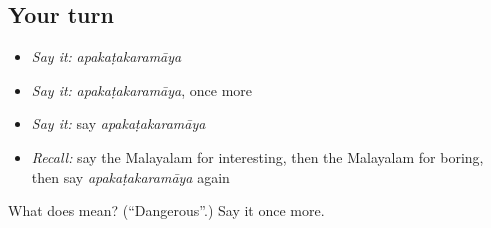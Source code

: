 \subsection*{Your turn}
\begin{itemize}
\raggedright
  \item \emph{Say it:} \emph{apakaṭakaramāya}
  \item \emph{Say it:} \emph{apakaṭakaramāya}, once more
  \item \emph{Say it:} say \emph{apakaṭakaramāya}
  \item \emph{Recall:} say the Malayalam for interesting, then the Malayalam for boring, then say \emph{apakaṭakaramāya} again
\end{itemize}

\begin{tcolorbox}[breakable,colback=teal!4,colframe=teal!35!black,title={Before you move on}]
What does  mean? (\textquotedblleft{}Dangerous\textquotedblright{}.) Say it once more.
\end{tcolorbox}
